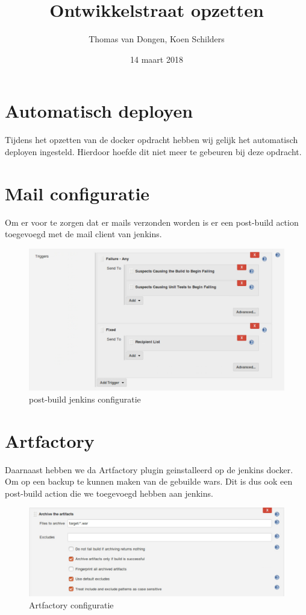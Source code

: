 \documentclass[12pt]{article}
\title{Ontwikkelstraat opzetten}
\author{Thomas van Dongen, Koen Schilders}
\date{14 maart 2018}
\begin{document}
\begin{titlepage}
\maketitle
\end{titlepage}


\section{Automatisch deployen}
Tijdens het opzetten van de docker opdracht hebben wij gelijk het automatisch deployen ingesteld. Hierdoor hoefde dit niet meer te gebeuren bij deze opdracht.

\section{Mail configuratie}
Om er voor te zorgen dat er mails verzonden worden is er een post-build action toegevoegd met de mail client van jenkins. 
\newline
\begin{figure}[H]
	\includegraphics[width=\textwidth]{images/emailsetting.png}
	\caption{post-build jenkins configuratie\label{fig:mail_conf}}
\end{figure}

\newpage
\section{Artfactory}
Daarnaast hebben we da Artfactory plugin geinstalleerd op de jenkins docker. Om op een backup te kunnen maken van de gebuilde wars. Dit is dus ook een post-build action die we toegevoegd hebben aan jenkins.

\begin{figure}[H]
	\includegraphics[width=\textwidth]{images/Archivesetting.png}
	\caption{Artfactory configuratie\label{fig:artfactory}}
\end{figure}
\end{document}
